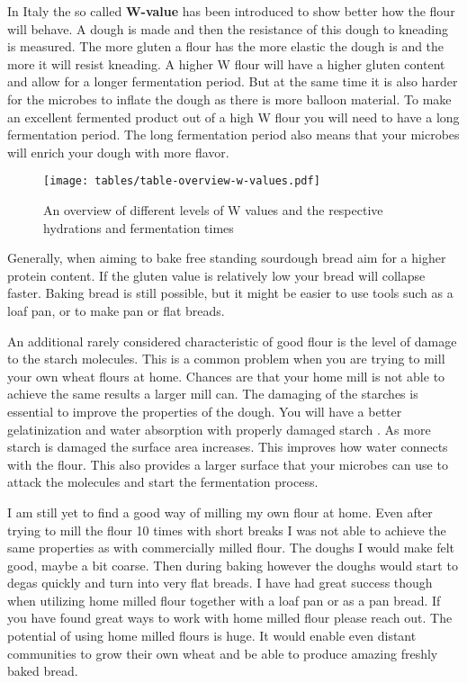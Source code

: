 In Italy the so called
\textbf{W-value} has been introduced to show better how the flour will behave.
A dough is made and then the resistance of this dough to kneading is measured.
The more gluten a flour has the more elastic the dough is and the more it will
resist kneading. A higher W flour will have a higher gluten content and allow for a longer
fermentation period. But at the same time it is also harder for the microbes to
inflate the dough as there is more balloon material. To make an excellent fermented
product out of a high W flour you will need to have a long fermentation period.
The long fermentation period also means that your microbes will enrich
your dough with more flavor.

\begin{figure}[!htb]
  \texttt{[image: tables/table-overview-w-values.pdf]}
  \caption{An overview of different levels of W values and the respective hydrations and fermentation times}
  \label{tab:w-value}
\end{figure}

Generally, when aiming to
bake free standing sourdough bread aim for a higher protein content. If the
gluten value is relatively low your bread will collapse faster. Baking bread
is still possible, but it might be easier to use tools such as a loaf pan, or
to make pan or flat breads.

An additional rarely considered characteristic of good flour is the level of damage to the
starch molecules. This is a common problem when you are trying to mill your own wheat flours at
home. Chances are that your home mill is not able to achieve the same results
a larger mill can. The damaging of the starches is essential to improve the
properties of the dough. You will have a better gelatinization and water
absorption with properly damaged starch \cite{starch+damage+flour}. As more
starch is damaged the surface area increases. This improves how water connects with the flour.
This also provides a larger surface that your microbes can use to attack the molecules 
and start the fermentation process.

I am still
yet to find a good way of milling my own flour at home. Even after trying to
mill the flour 10 times with short breaks I was not able to achieve the same
properties as with commercially milled flour. The doughs I would make felt
good, maybe a bit coarse. Then during baking however the doughs would start to
degas quickly and turn into very flat breads. I have had great success though when
utilizing home milled flour together with a loaf pan or as a pan bread. If you
have found great ways to work with home milled flour please reach out. The potential
of using home milled flours is huge. It would enable even distant communities
to grow their own wheat and be able to produce amazing freshly baked bread.
